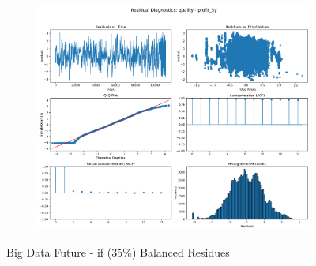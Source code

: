 \documentclass[11pt,english,a4paper,hidelinks]{book}
\begin{document}
\begin{figure}[H]
\begin{subfigure}[b]{0.32\textwidth}
    \end{subfigure}
    \hfill
    \begin{subfigure}[b]{0.32\textwidth}
        \centering
        \includegraphics[width=\textwidth]{images/code/models/linear_regression/first_model/IF HARD Balanced/quality_profit_5y_residuals - Gaussian.png}
    \end{subfigure}
    \caption{Big Data Future - \acrshort{if} (35\%) Balanced Residues}
    \label{fig:linear_regression_AF_residues_windowed}
\end{figure}
\end{document}
